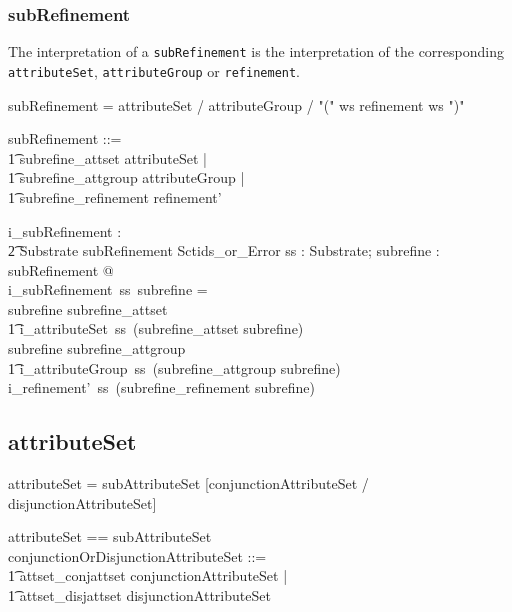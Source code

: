 \documentclass{article}
\def\spec#1{{\tt #1}}
\def\bnf#1{{\scriptsize {{#1}} }}
\begin{document}
\subsubsection{subRefinement}
The interpretation of a \spec{subRefinement} is the interpretation of the corresponding \spec{attributeSet}, \spec{attributeGroup} or \spec{refinement}.

\begin{framed}
\noindent
\bnf{subRefinement = attributeSet / attributeGroup / "(" ws refinement ws ")"}
\end{framed}

\begin{zed}
subRefinement ::= \\
\t1 subrefine\_attset \ldata attributeSet \rdata | \\
\t1 subrefine\_attgroup \ldata attributeGroup \rdata | \\
\t1 subrefine\_refinement \ldata refinement' \rdata
\end{zed}


\begin{gendef}
   i\_subRefinement : \\
\t2 Substrate \fun subRefinement \fun Sctids\_or\_Error
\where
   \forall ss : Substrate; subrefine : subRefinement @ \\
   i\_subRefinement~ss~subrefine = \\
   \IF subrefine \in \ran subrefine\_attset \\
\t1 \THEN i\_attributeSet~ss~(subrefine\_attset \inv subrefine) \\
   \ELSE \IF subrefine \in \ran subrefine\_attgroup \\
\t1 \THEN i\_attributeGroup~ss~(subrefine\_attgroup \inv subrefine) \\
  \ELSE i\_refinement'~ss~(subrefine\_refinement \inv subrefine)
\end{gendef}

\subsection{attributeSet}

\begin{framed}
\noindent
\bnf{ attributeSet = subAttributeSet [conjunctionAttributeSet / disjunctionAttributeSet]}
\end{framed}

\begin{zed}
attributeSet == subAttributeSet \cross \optional[conjunctionOrDisjunctionAttributeSet] \\
[attributeSet']
\also
conjunctionOrDisjunctionAttributeSet ::= \\
\t1 attset\_conjattset \ldata conjunctionAttributeSet \rdata | \\
\t1 attset\_disjattset \ldata disjunctionAttributeSet \rdata
\end{zed}
\end{document}
